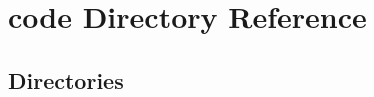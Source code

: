 \section{code Directory Reference}
\label{dir_050edd66366d13764f98250ef6db77f6}
\subsection*{Directories}
\begin{DoxyCompactItemize}
\end{DoxyCompactItemize}
